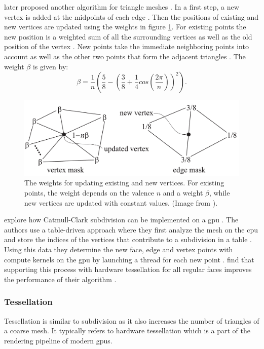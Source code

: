 \citeauthor{loop_subdivision} later proposed another algorithm for triangle meshes \cite{loop_subdivision}.
In a first step, a new vertex is added at the midpoints of each edge \cite{loop_subdivision}.
Then the positions of existing and new vertices are updated using the weights in figure \ref{fig:loop_subdivision}.
For existing points the new position is a weighted sum of all the surrounding vertices as well as the old position of the vertex \cite{loop_subdivision}.
New points take the immediate neighboring points into account as well as the other two points that form the adjacent triangles \cite{loop_subdivision}.
The weight $\beta$ is given by:
\begin{equation*}
    \beta = \frac{1}{n}(\frac{5}{8} - (\frac{3}{8} + \frac{1}{4}cos(\frac{2\pi}{n}))^2).
\end{equation*}
\begin{figure}[ht]
    \centering
    \includegraphics[width=0.5\linewidth]{img/loop_subdivision.png}
    \caption[Weights in Loop subdivision]{The weights for updating existing and new vertices. For existing points, the weight depends on the valence $n$ and a weight $\beta$, while new vertices are updated with constant values. (Image from \cite{realtime}).}
    \label{fig:loop_subdivision}
\end{figure}

\citeauthor{niessner_subdivision} explore how Catmull-Clark subdivision can be implemented on a \ac{gpu} \cite{niessner_subdivision}.
The authors use a table-driven approach where they first analyze the mesh on the \ac{cpu} and store the indices of the vertices that contribute to a subdivision in a table \cite{niessner_subdivision}.
Using this data they determine the new face, edge and vertex points with compute kernels on the \ac{gpu} by launching a thread for each new point \cite{niessner_subdivision}.
\citeauthor{niessner_subdivision} find that supporting this process with hardware tessellation for all regular faces improves the performance of their algorithm \cite{niessner_subdivision}.


\subsubsection*{Tessellation}
Tessellation is similar to subdivision as it also increases the number of triangles of a coarse mesh.
It typically refers to hardware tessellation which is a part of the rendering pipeline of modern \acp{gpu}.


